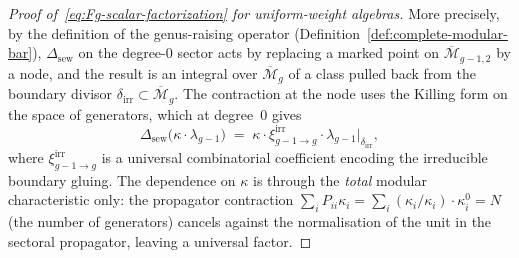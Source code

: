 \begin{proof}[Proof of~\eqref{eq:Fg-scalar-factorization}
for uniform-weight algebras]
More precisely, by the definition of the genus-raising operator
(Definition~\ref{def:complete-modular-bar}), $\Delta_{\mathrm{sew}}$
on the degree-$0$ sector acts by replacing a marked point on
$\overline{\mathcal{M}}_{g-1,2}$ by a node, and the result is an
integral over $\overline{\mathcal{M}}_g$ of a class pulled back
from the boundary divisor $\delta_{\mathrm{irr}} \subset
\overline{\mathcal{M}}_g$. The contraction at the node uses
the Killing form on the space of generators, which at degree~$0$
gives
\begin{equation}\label{eq:sewing-scalar}
\Delta_{\mathrm{sew}}\bigl(\kappa \cdot \lambda_{g-1}\bigr)
\;=\; \kappa \cdot \xi_{g-1 \to g}^{\mathrm{irr}} \cdot
\lambda_{g-1}\big|_{\delta_{\mathrm{irr}}},
\end{equation}
where $\xi_{g-1 \to g}^{\mathrm{irr}}$ is a universal
combinatorial coefficient encoding the irreducible boundary
gluing. The dependence on $\kappa$ is through the
\emph{total} modular characteristic only: the propagator
contraction $\sum_i P_{ii} \kappa_i = \sum_i (\kappa_i/\kappa_i)
\cdot \kappa_i^0 = N$ (the number of generators) cancels against
the normalisation of the unit in the sectoral propagator, leaving
a universal factor.


\end{proof}
